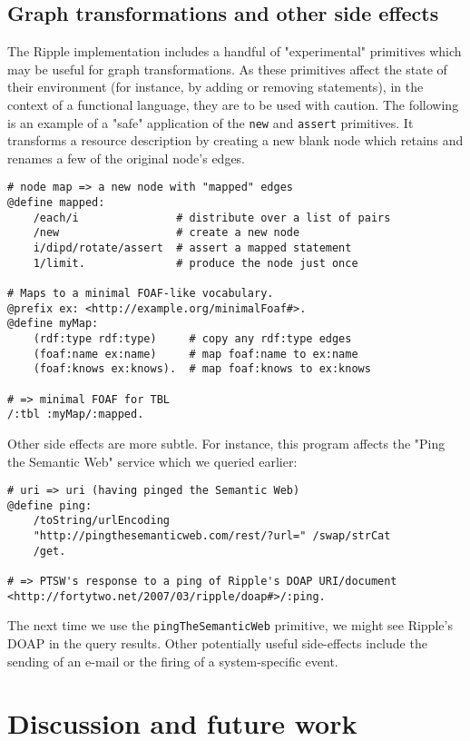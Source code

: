 \documentclass[runningheads]{llncs}
\begin{document}
\subsection{Graph transformations and other side effects}

The Ripple implementation includes a handful of "experimental" primitives which may be useful for graph transformations.  As these primitives affect the state of their environment (for instance, by adding or removing statements), in the context of a functional language, they are to be used with caution.  The following is an example of a "safe" application of the \texttt{new} and \texttt{assert} primitives.  It transforms a resource description by creating a new blank node which retains and renames a few of the original node's edges.

\begin{verbatim}
# node map => a new node with "mapped" edges
@define mapped:
    /each/i               # distribute over a list of pairs
    /new                  # create a new node
    i/dipd/rotate/assert  # assert a mapped statement
    1/limit.              # produce the node just once

# Maps to a minimal FOAF-like vocabulary.
@prefix ex: <http://example.org/minimalFoaf#>.
@define myMap:
    (rdf:type rdf:type)     # copy any rdf:type edges
    (foaf:name ex:name)     # map foaf:name to ex:name
    (foaf:knows ex:knows).  # map foaf:knows to ex:knows

# => minimal FOAF for TBL
/:tbl :myMap/:mapped.
\end{verbatim}

Other side effects are more subtle.  For instance, this program affects the "Ping the Semantic Web" service which we queried earlier:
\begin{verbatim}
# uri => uri (having pinged the Semantic Web)
@define ping:
    /toString/urlEncoding
    "http://pingthesemanticweb.com/rest/?url=" /swap/strCat
    /get.

# => PTSW's response to a ping of Ripple's DOAP URI/document
<http://fortytwo.net/2007/03/ripple/doap#>/:ping.
\end{verbatim}
The next time we use the \texttt{pingTheSemanticWeb} primitive, we might see Ripple's DOAP in the query results.  Other potentially useful side-effects include the sending of an e-mail or the firing of a system-specific event.

\section{Discussion and future work}
\end{document}
